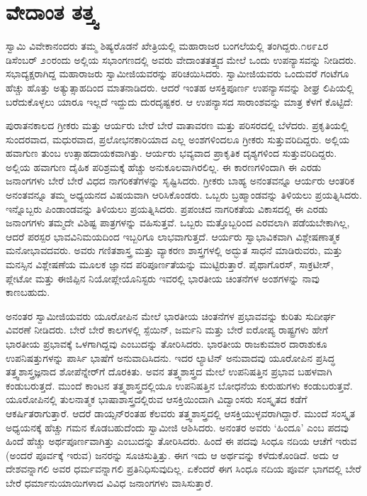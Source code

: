 
\chapter{ವೇದಾಂತ ತತ್ತ್ವ}

ಸ್ವಾಮಿ ವಿವೇಕಾನಂದರು ತಮ್ಮ ಶಿಷ್ಯರೊಡನೆ ಖೇತ್ರಿಯಲ್ಲಿ ಮಹಾರಾಜರ ಬಂಗಲೆಯಲ್ಲಿ ತಂಗಿದ್ದರು.೧೮೯೭ರ ಡಿಸೆಂಬರ್​ ೨೦ರಂದು ಅಲ್ಲಿಯ ಸಭಾಂಗಣದಲ್ಲಿ ಅವರು ವೇದಾಂತತತ್ತ್ವದ ಮೇಲೆ ಒಂದು ಉಪನ್ಯಾಸವನ್ನು ನೀಡಿದರು. ಸಭಾದ್ಯಕ್ಷರಾಗಿದ್ದ ಮಹಾರಾಜರು ಸ್ವಾಮೀಜಿಯವರನ್ನು ಪರಿಚಯಿಸಿದರು. ಸ್ವಾಮೀಜಿಯವರು ಒಂದುವರೆ ಗಂಟೆಗೂ ಹೆಚ್ಚು ಹೊತ್ತು ಅತ್ಯುತ್ಸಾಹದಿಂದ ಮಾತನಾಡಿದರು. ಆದರೆ ಇಂತಹ ಆಸಕ್ತಿಪೂರ್ಣ ಉಪನ್ಯಾಸವನ್ನು ಶೀಘ್ರ ಲಿಪಿಯಲ್ಲಿ ಬರೆದುಕೊಳ್ಳಲು ಯಾರೂ ಇಲ್ಲದೆ ಇದ್ದುದು ದುರದೃಷ್ಟಕರ. ಆ ಉಪನ್ಯಾಸದ ಸಾರಾಂಶವನ್ನು ಮಾತ್ರ ಕೆಳಗೆ ಕೊಟ್ಟಿದೆ:

ಪುರಾತನಕಾಲದ ಗ್ರೀಕರು ಮತ್ತು ಆರ್ಯರು ಬೇರೆ ಬೇರೆ ವಾತಾವರಣ ಮತ್ತು ಪರಿಸರದಲ್ಲಿ ಬೆಳೆದರು. ಪ್ರಕೃತಿಯಲ್ಲಿ ಸುಂದರವಾದ, ಮಧುರವಾದ, ಪ್ರಲೋಭನಕಾರಿಯಾದ ಎಲ್ಲ ಅಂಶಗಳಿಂದಲೂ ಗ್ರೀಕರು ಸುತ್ತುವರಿದಿದ್ದರು. ಅಲ್ಲಿಯ ಹವಾಗುಣ ತುಂಬ ಉತ್ಸಾಹದಾಯಕವಾಗಿತ್ತು. ಆರ್ಯರು ಭವ್ಯವಾದ ಪ್ರಾಕೃತಿಕ ದೃಶ್ಯಗಳಿಂದ ಸುತ್ತುವರಿದಿದ್ದರು. ಅಲ್ಲಿಯ ಹವಾಗುಣ ದೈಹಿಕ ಪರಿಶ್ರಮಕ್ಕೆ ಹೆಚ್ಚು ಅನುಕೂಲವಾಗಿರಲಿಲ್ಲ. ಈ ಕಾರಣಗಳಿಂದಾಗಿ ಈ ಎರಡು ಜನಾಂಗಗಳು ಬೇರೆ ಬೇರೆ ವಿಧದ ನಾಗರಿಕತೆಗಳನ್ನು ಸೃಷ್ಟಿಸಿದರು. ಗ್ರೀಕರು ಬಾಹ್ಯ ಅನಂತವನ್ನೂ ಆರ್ಯರು ಆಂತರಿಕ ಅನಂತವನ್ನೂ ತಮ್ಮ ಅಧ್ಯಯನದ ವಿಷಯವಾಗಿ ಆರಿಸಿಕೊಂಡರು. ಒಬ್ಬರು ಬ್ರಹ್ಮಾಂಡವನ್ನು ತಿಳಿಯಲು ಪ್ರಯತ್ನಿಸಿದರು. ಇನ್ನೊಬ್ಬರು ಪಿಂಡಾಂಡವನ್ನು ತಿಳಿಯಲು ಪ್ರಯತ್ನಿಸಿದರು. ಪ್ರಪಂಚದ ನಾಗರಿಕತೆಯ ವಿಕಾಸದಲ್ಲಿ ಈ ಎರಡು ಜನಾಂಗಗಳು ತಮ್ಮದೇ ವಿಶಿಷ್ಟ ಪಾತ್ರಗಳನ್ನು ವಹಿಸುತ್ತವೆ. ಒಬ್ಬರು ಮತ್ತೊಬ್ಬರಿಂದ ಎರವಲಾಗಿ ಪಡೆಯಬೇಕಾಗಿಲ್ಲ, ಆದರೆ ಪರಸ್ಪರ ಭಾವವಿನಿಮಯದಿಂದ ಇಬ್ಬರಿಗೂ ಲಾಭವಾಗುತ್ತದೆ. ಆರ್ಯರು ಸ್ವಾಭಾವಿಕವಾಗಿ ವಿಶ್ಲೇಷಣಾತ್ಮಕ ಮನೋಭಾವದವರು. ಅವರು ಗಣಿತಶಾಸ್ತ್ರ ಮತ್ತು ವ್ಯಾಕರಣ ಶಾಸ್ತ್ರಗಳಲ್ಲಿ ಅದ್ಭುತ ಸಾಧನೆ ಮಾಡಿರುವರು, ಮತ್ತು ಮನಸ್ಸಿನ ವಿಶ್ಲೇಷಣೆಯ ಮೂಲಕ ಜ್ಞಾನದ ಪರಿಪೂರ್ಣತೆಯನ್ನು ಮುಟ್ಟಿರುತ್ತಾರೆ. ಪೈಥಾಗೊರಸ್​, ಸಾಕ್ರಟೀಸ್​, ಪ್ಲೇಟೋ ಮತ್ತು ಈಜಿಪ್ಪಿನ ನಿಯೋಪ್ಲೇಯೊನಿಸ್ಟರು ಇವರಲ್ಲಿ ಭಾರತೀಯ ಚಿಂತನೆಗಳ ಅಂಶಗಳನ್ನು ನಾವು ಕಾಣಬಹುದು. 

ಅನಂತರ ಸ್ವಾಮೀಜಿಯವರು ಯೂರೋಪಿನ ಮೇಲೆ ಭಾರತೀಯ ಚಿಂತನೆಗಳ ಪ್ರಭಾವವನ್ನು ಕುರಿತು ಸುದೀರ್ಘ ವಿವರಣೆ ನೀಡಿದರು. ಬೇರೆ ಬೇರೆ ಕಾಲಗಳಲ್ಲಿ ಸ್ಪೆಯಿನ್​, ಜರ್ಮನಿ ಮತ್ತು ಬೇರೆ ಐರೋಪ್ಯ ರಾಷ್ಟ್ರಗಳು ಹೇಗೆ ಭಾರತೀಯ ಪ್ರಭಾವಕ್ಕೆ ಒಳಗಾಗಿದ್ದವು ಎಂಬುದನ್ನು ತೋರಿಸಿದರು. ಭಾರತೀಯ ರಾಜಕುಮಾರ ದಾರಾಶುಕೂ ಉಪನಿಷತ್ತುಗಳನ್ನು ಪಾರ್ಸಿ ಭಾಷೆಗೆ ಅನುವಾದಿಸಿದನು. ಇದರ ಲ್ಯಾಟಿನ್​ ಅನುವಾದವು ಯೂರೋಪಿನ ಪ್ರಸಿದ್ಧ ತತ್ತ್ವಶಾಸ್ತ್ರಜ್ಞನಾದ ಶೋಪೆನ್ನೇರ್​ಗೆ ದೊರಕಿತು. ಅವನ ತತ್ತ್ವಶಾಸ್ತ್ರದ ಮೇಲೆ ಉಪನಿಷತ್ತಿನ ಪ್ರಭಾವ ಬಹಳವಾಗಿ ಕಂಡುಬರುತ್ತದೆ. ಮುಂದೆ ಕಾಂಟನ ತತ್ತ್ವಶಾಸ್ತ್ರದಲ್ಲಿಯೂ ಉಪನಿಷತ್ತಿನ ಬೋಧನೆಯ ಕುರುಹುಗಳು ಕಂಡುಬರುತ್ತವೆ. ಯೂರೋಪಿನಲ್ಲಿ ತುಲನಾತ್ಮಕ ಭಾಷಾಶಾಸ್ತ್ರದಲ್ಲಿರುವ ಆಸಕ್ತಿಯಿಂದಾಗಿ ವಿದ್ವಾಂಸರು ಸಂಸ್ಕೃತದ ಕಡೆಗೆ ಆಕರ್ಷಿತರಾಗುತ್ತಾರೆ. ಆದರೆ ಡಾಯ್ಸನ್​ರಂತಹ ಕೆಲವರು ತತ್ತ್ವಶಾಸ್ತ್ರದಲ್ಲಿ ಆಸಕ್ತಿಯುಳ್ಳವರಾಗಿದ್ದಾರೆ. ಮುಂದೆ ಸಂಸ್ಕೃತ ಅಧ್ಯಯನಕ್ಕೆ ಹೆಚ್ಚು ಗಮನ ಕೊಡಬಹುದೆಂದು ಸ್ವಾಮೀಜಿ ಆಶಿಸಿದರು. ಅನಂತರ ಅವರು ‘ಹಿಂದೂ’ ಎಂಬ ಪದವು ಹಿಂದೆ ಹೆಚ್ಚು ಅರ್ಥಪೂರ್ಣವಾಗಿತ್ತು ಎಂಬುದನ್ನು ತೋರಿಸಿದರು. ಹಿಂದೆ ಈ ಪದವು ಸಿಂಧೂ ನದಿಯ ಆಚೆಗೆ ಇರುವ (ಅಂದರೆ ಪೂರ್ವಕ್ಕೆ ಇರುವ) ಜನರನ್ನು ಸೂಚಿಸುತ್ತಿತ್ತು. ಈಗ ಇದು ಆ ಅರ್ಥವನ್ನು ಕಳೆದುಕೊಂಡಿದೆ. ಅದು ಆ ದೇಶವನ್ನಾಗಲಿ ಅವರ ಧರ್ಮವನ್ನಾಗಲಿ ಪ್ರತಿನಿಧಿಸುವುದಿಲ್ಲ. ಏಕೆಂದರೆ ಈಗ ಸಿಂಧೂ ನದಿಯ ಪೂರ್ವ ಭಾಗದಲ್ಲಿ ಬೇರೆ ಬೇರೆ ಧರ್ಮಾನುಯಾಯಿಗಳಾದ ವಿವಿಧ ಜನಾಂಗಗಳು ವಾಸಿಸುತ್ತಾರೆ. 

